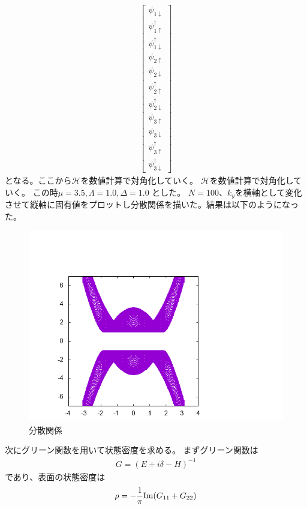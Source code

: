 \documentclass{jarticle}
\begin{document}
\begin{align}
\begin{bmatrix}
	\psi_{1\downarrow} \\ 
	\psi_{1\uparrow}^\dagger \\ 
	\psi_{1\downarrow}^\dagger \\ 
	\psi_{2\uparrow} \\ 
	\psi_{2\downarrow} \\ 
	\psi_{2\uparrow}^\dagger \\ 
	\psi_{2\downarrow}^\dagger \\ 
	\psi_{3\uparrow} \\ 
	\psi_{3\downarrow} \\ 
	\psi_{3\uparrow}^\dagger \\ 
	\psi_{3\downarrow}^\dagger
	\end{bmatrix} 
	\end{align}
	となる。ここから$\mathcal{H}$を数値計算で対角化していく。
$\mathcal{H}$を数値計算で対角化していく。	この時$\mu=3.5, \Lambda=1.0, \Delta=1.0$	とした。
$N=100$、$k_y$を横軸として変化させて縦軸に固有値をプロットし分散関係を描いた。結果は以下のようになった。\\		
\begin{figure}[H]
	\centering
	\includegraphics{../../16/KS/16-1/graph/data.png}			%
	\caption{分散関係}
\end{figure}
次にグリーン関数を用いて状態密度を求める。
まずグリーン関数は
\begin{align}
G=(E+i\delta-H)^{-1}
\end{align}
であり、表面の状態密度は
\begin{align}
\rho=-\dfrac{1}{\pi}{\rm Im}(G_{11}+G_{22})
\end{align}
\end{document}
